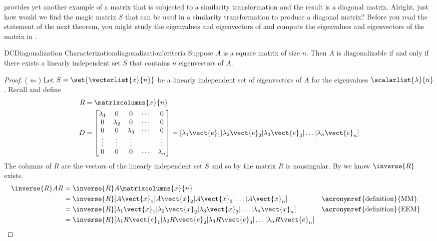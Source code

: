 %
 provides yet another example of a matrix that is subjected to a similarity transformation and the result is a diagonal matrix.  Alright, just how would we find the magic matrix $S$ that can be used in a similarity transformation to produce a diagonal matrix?  Before you read the statement of the next theorem, you might study the eigenvalues and eigenvectors of  and compute the eigenvalues and eigenvectors of the matrix in .
%
\begin{theorem}{DC}{Diagonalization Characterization}{diagonalization!criteria}
Suppose $A$ is a square matrix of size $n$.  Then $A$ is diagonalizable if and only if there exists a linearly independent set $S$ that contains $n$ eigenvectors of $A$.
\end{theorem}
%
\begin{proof}
($\Leftarrow$)  Let $S=\set{\vectorlist{x}{n}}$ be a linearly independent set of eigenvectors of $A$ for the eigenvalues $\scalarlist{\lambda}{n}$.  Recall  and define
%
\begin{align*}
R&=\matrixcolumns{x}{n}\\
D&=
\begin{bmatrix}
\lambda_1 & 0 & 0 &\cdots & 0\\
 0 &\lambda_2 & 0 &\cdots & 0\\
 0 & 0 &\lambda_3 &\cdots & 0\\
 \vdots & \vdots & \vdots & & \vdots\\
 0 & 0 & 0 &\cdots & \lambda_n
\end{bmatrix}
=[\lambda_1\vect{e}_1|\lambda_2\vect{e}_2|\lambda_3\vect{e}_3|\ldots|\lambda_n\vect{e}_n]
\end{align*}
%
The columns of $R$ are the vectors of the linearly independent set $S$ and so by  the matrix $R$ is nonsingular.  By  we know $\inverse{R}$ exists.
%
\begin{align*}
\inverse{R}AR&=
\inverse{R}A\matrixcolumns{x}{n}\\
%
&=\inverse{R}[A\vect{x}_1|A\vect{x}_2|A\vect{x}_3|\ldots|A\vect{x}_n]
&&\text{\acronymref{definition}{MM}}\\
%
&=\inverse{R}[\lambda_1\vect{x}_1|\lambda_2\vect{x}_2|\lambda_3\vect{x}_3|\ldots|\lambda_n\vect{x}_n]
&&\text{\acronymref{definition}{EEM}}\\
%
&=\inverse{R}[\lambda_1R\vect{e}_1|\lambda_2R\vect{e}_2|\lambda_3R\vect{e}_3|\ldots|\lambda_nR\vect{e}_n]

\end{align*}
\end{proof}
